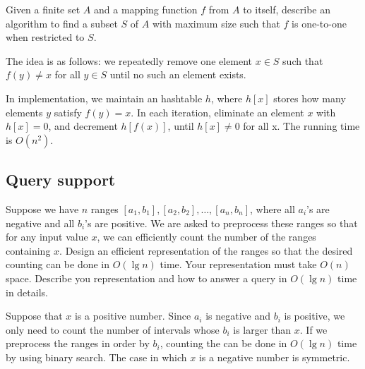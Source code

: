 \begin{Exercise}[origin={NCTU CSIE 91}]
Given a finite set $A$ and a mapping function $f$ from $A$ to itself, describe an algorithm to find a subset $S$ of $A$ with maximum size such that $f$ is one-to-one when restricted to $S$.
\end{Exercise}
\begin{Answer}
The idea is as follows: we repeatedly remove one element $x \in S$ such that $f(y) \neq x$ for all $y \in S$ until no such an element exists.

In implementation, we maintain an hashtable $h$, where $h[x]$ stores how many elements $y$ satisfy $f(y) = x$. In each iteration, eliminate an element $x$ with $h[x] = 0$, and decrement $h[f(x)]$, until $h[x] \neq 0$ for all x. The running time is $O(n^2)$.
\end{Answer}

\subsection{Query support}

\begin{Exercise}[origin={NTHU CSIE 100}]
Suppose we have $n$ ranges $[a_1, b_1], [a_2, b_2], \dots, [a_n, b_n]$, where all $a_i$'s are negative and all $b_i$'s are positive. We are asked to preprocess these ranges so that for any input value $x$, we can efficiently count the number of the ranges containing $x$. Design an efficient representation of the ranges so that the desired counting can be done in $O(\lg n)$ time. Your representation must take $O(n)$ space. Describe you representation and how to answer a query in $O(\lg n)$ time in details.
\end{Exercise}
\begin{Answer}
Suppose that $x$ is a positive number. Since $a_i$ is negative and $b_i$ is positive, we only need to count the number of intervals whose $b_i$ is larger than $x$. If we preprocess the ranges in order by $b_i$, counting the can be done in $O(\lg n)$ time by using binary search. The case in which $x$ is a negative number is symmetric.
\end{Answer}

